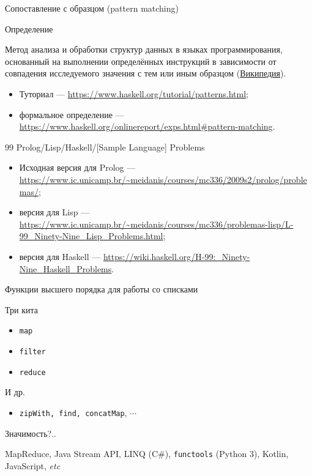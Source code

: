 \documentclass{beamer}
\begin{document}
  \begin{frame}{Сопоставление с образцом (pattern matching)}
      \begin{block}{Определение}
        \texttt{}
      
        Метод анализа и обработки структур данных в языках программирования, основанный на выполнении определённых инструкций в зависимости от совпадения исследуемого значения с тем или иным образцом (\href{https://ru.wikipedia.org/wiki/Сопоставление_с_образцом}{Википедия}).
      \end{block}
      \begin{itemize}
          \item Туториал --- \url{https://www.haskell.org/tutorial/patterns.html};
          \item формальное определение --- \url{https://www.haskell.org/onlinereport/exps.html\#pattern-matching}.
      \end{itemize}
  \end{frame}
  \begin{frame}{99 Prolog/Lisp/Haskell/[Sample Language] Problems}
      \begin{itemize}
          \item Исходная версия для Prolog --- \url{https://www.ic.unicamp.br/~meidanis/courses/mc336/2009s2/prolog/problemas/};
          \item версия для Lisp ---
          \url{https://www.ic.unicamp.br/~meidanis/courses/mc336/problemas-lisp/L-99_Ninety-Nine_Lisp_Problems.html};
          \item версия для Haskell --- \url{https://wiki.haskell.org/H-99:_Ninety-Nine_Haskell_Problems}.
      \end{itemize}
  \end{frame}
  \begin{frame}{Функции высшего порядка для работы со списками}
      \begin{block}{Три кита}
      \begin{itemize}
          \item \texttt{map}
          \item \texttt{filter}
          \item \texttt{reduce}
      \end{itemize}
      \end{block}
      \begin{block}{И др.}
      \begin{itemize}
          \item \texttt{zipWith,~find,~concatMap}, $\cdots$
      \end{itemize}
      \end{block}
      \begin{block}{Значимость?..}
        \texttt{}
      
        MapReduce, Java Stream API, LINQ (C\#), \texttt{functools} (Python 3), Kotlin, JavaScript, \textit{etc}
      \end{block}
  \end{frame}
\end{document}
